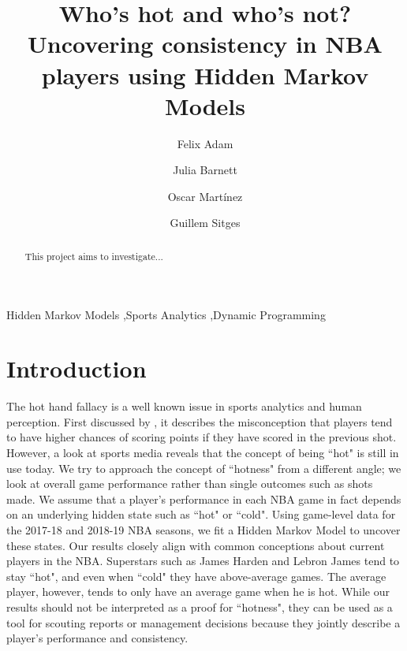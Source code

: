\documentclass[12pt, authoryear]{elsarticle}
\begin{document}
\begin{frontmatter}  %

\title{Who's hot and who's not? \\  Uncovering consistency in NBA players using Hidden Markov Models}

\author[Add1]{Felix Adam}

\author[Add1]{Julia Barnett}

\author[Add1]{Oscar Mart\'inez}

\author[Add1]{Guillem Sitges}

\address[Add1]{Barcelona Graduate School of Economics, Barcelona, Spain}




\begin{keyword}
\footnotesize{
Hidden Markov Models  \sep Sports Analytics \sep  Dynamic Programming \\ \vspace{0.3cm}
}
\end{keyword}
\vspace{0.5cm}
\end{frontmatter}

\headsep 35pt %
\begin{abstract}
This project aims to investigate...
\end{abstract}

\section{Introduction}

The hot hand fallacy  is a well known issue in sports analytics and human perception. First discussed by \cite{gilovich1985hot}, it describes the misconception that players tend to have higher chances of scoring points if they have scored in the previous shot. However, a look at sports media reveals that the concept of being ``hot" is still in use today. We try to approach the concept of ``hotness" from a different angle; we look at overall game performance rather than single outcomes such as shots made. We assume that a player's performance in each NBA game in fact depends on an underlying hidden state such as ``hot" or ``cold". Using game-level data for the 2017-18 and 2018-19 NBA seasons, we fit a Hidden Markov Model to uncover these states. Our results closely align with common conceptions about current players in the NBA. Superstars such as James Harden and Lebron James tend to stay ``hot", and even when ``cold" they have above-average games. The average player, however, tends to only have an average game when he is hot. While our results should not be interpreted as a proof for ``hotness", they can be used as a tool for scouting reports or management decisions because they jointly describe a player's performance and consistency. 
\end{document}
